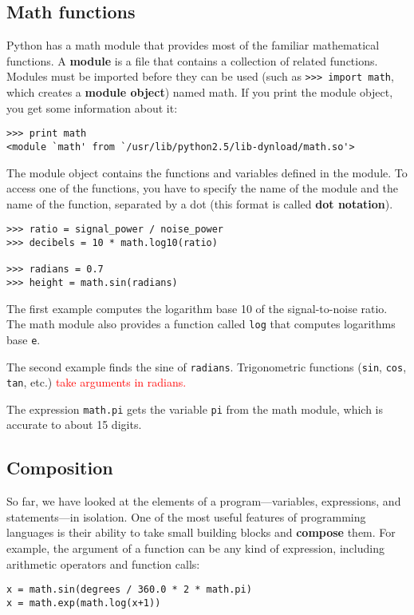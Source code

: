 \documentclass{article}
\begin{document}
\subsection{Math functions}
Python has a math module that provides most of the familiar
mathematical functions. A \textbf{module} is a file that
contains a collection of related functions. Modules must
be imported before they can be used
(such as \verb|>>> import math|, which creates a
\textbf{module object}) named math. If you print the module
object, you get some information about it:
\begin{verbatim}
>>> print math
<module `math' from `/usr/lib/python2.5/lib-dynload/math.so'>
\end{verbatim}
The module object contains the functions and variables defined
in the module. To access one of the functions, you have to specify
the name of the module and the name of the function, separated
by a dot (this format is called \textbf{dot notation}).
\begin{verbatim}
>>> ratio = signal_power / noise_power
>>> decibels = 10 * math.log10(ratio)

>>> radians = 0.7
>>> height = math.sin(radians)
\end{verbatim}
The first example computes the logarithm base 10 of the
signal-to-noise ratio. The math module also provides a function called
\verb|log| that computes logarithms base \verb|e|.

The second example finds the
sine of \verb|radians|.
Trigonometric functions (\verb|sin|, \verb|cos|, \verb|tan|, etc.)
\textcolor{red}{take arguments in radians.}

The expression \verb|math.pi| gets the variable \verb|pi| from
the math module, which is accurate to about 15 digits.

\subsection{Composition}
So far, we have looked at the elements of a program—variables,
expressions, and statements—in
isolation.
One of the most useful features of programming languages is their
ability to take small building
blocks and \textbf{compose} them. For example,
the argument of a function can be any kind of expression,
including arithmetic operators and function calls:
\begin{verbatim}
x = math.sin(degrees / 360.0 * 2 * math.pi)
x = math.exp(math.log(x+1))
\end{verbatim}
\end{document}
